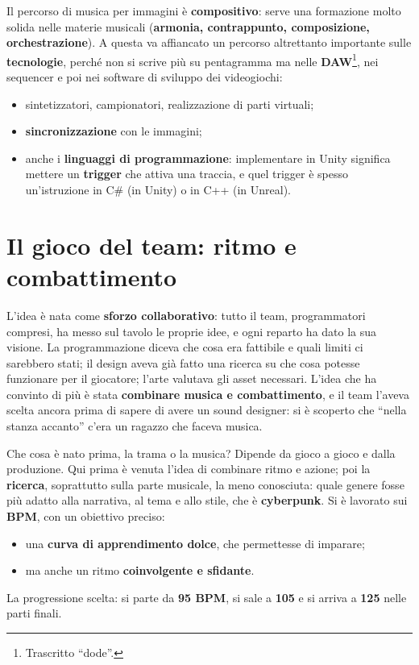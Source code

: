 Il percorso di musica per immagini è \textbf{compositivo}: serve una formazione
molto solida nelle materie musicali (\textbf{armonia, contrappunto, composizione,
orchestrazione}). A questa va affiancato un percorso altrettanto importante sulle
\textbf{tecnologie}, perché non si scrive più su pentagramma ma nelle
\textbf{DAW}\footnote{Trascritto ``dode''.}, nei sequencer e poi nei software di
sviluppo dei videogiochi:
\begin{itemize}
  \item sintetizzatori, campionatori, realizzazione di parti virtuali;
  \item \textbf{sincronizzazione} con le immagini;
  \item anche i \textbf{linguaggi di programmazione}: implementare in Unity
        significa mettere un \textbf{trigger} che attiva una traccia, e quel
        trigger è spesso un'istruzione in C\# (in Unity) o in C++ (in Unreal).
\end{itemize}

\section{Il gioco del team: ritmo e combattimento}
\label{sec:c1-5-gioco}

L'idea è nata come \textbf{sforzo collaborativo}: tutto il team, programmatori
compresi, ha messo sul tavolo le proprie idee, e ogni reparto ha dato la sua
visione. La programmazione diceva che cosa era fattibile e quali limiti ci
sarebbero stati; il design aveva già fatto una ricerca su che cosa potesse
funzionare per il giocatore; l'arte valutava gli asset necessari. L'idea che ha
convinto di più è stata \textbf{combinare musica e combattimento}, e il team
l'aveva scelta ancora prima di sapere di avere un sound designer: si è scoperto
che ``nella stanza accanto'' c'era un ragazzo che faceva musica.

Che cosa è nato prima, la trama o la musica? Dipende da gioco a gioco e dalla
produzione. Qui prima è venuta l'idea di combinare ritmo e azione; poi la
\textbf{ricerca}, soprattutto sulla parte musicale, la meno conosciuta: quale
genere fosse più adatto alla narrativa, al tema e allo stile, che è
\textbf{cyberpunk}. Si è lavorato sui \textbf{BPM}, con un obiettivo preciso:
\begin{itemize}
  \item una \textbf{curva di apprendimento dolce}, che permettesse di imparare;
  \item ma anche un ritmo \textbf{coinvolgente e sfidante}.
\end{itemize}
La progressione scelta: si parte da \textbf{95 BPM}, si sale a \textbf{105} e si
arriva a \textbf{125} nelle parti finali.

